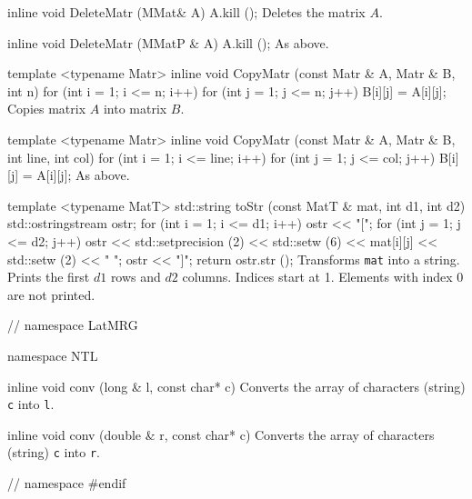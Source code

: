 {inline void DeleteMatr (MMat& A)\hide
{
    A.kill ();
}
\endhide
\endcode
\tab
Deletes the matrix $A$.
\endtab
\code


inline void DeleteMatr (MMatP & A)\hide
{
    A.kill ();
}
\endhide
\endcode
\tab
As above.
\endtab
\code


template <typename Matr>
inline void CopyMatr (const Matr & A, Matr & B, int n)\hide
{
    for (int i = 1; i <= n; i++)
        for (int j = 1; j <= n; j++)
            B[i][j] = A[i][j];
}
\endhide
\endcode
\tab
Copies matrix $A$ into matrix $B$.
\endtab
\code


template <typename Matr>
inline void CopyMatr (const Matr & A, Matr & B, int line, int col)\hide
{
    for (int i = 1; i <= line; i++)
        for (int j = 1; j <= col; j++)
            B[i][j] = A[i][j];
}
\endhide
\endcode
\tab
As above.
\endtab
\code


template <typename MatT>
std::string toStr (const MatT & mat, int d1, int d2) \hide
{
   std::ostringstream ostr;
   for (int i = 1; i <= d1; i++) {
      ostr << "[";
      for (int j = 1; j <= d2; j++) {
         ostr << std::setprecision (2) << std::setw (6) << mat[i][j] <<
            std::setw (2) << " ";
      }
      ostr << "]\n";
   }
   return ostr.str ();
}\endhide
\endcode
\tab
Transforms \texttt{mat} into a string. Prints the first $d1$ rows and
 $d2$ columns. Indices start at 1. Elements with index 0 are not printed.
\endtab
\code

}     // namespace LatMRG
\endcode


\code
namespace NTL {

inline void conv (long & l, const char* c) \endhide
\endcode
\tab
Converts the array of characters (string) \texttt{c} into \texttt{l}.
\endtab
\code


inline void conv (double & r, const char* c) \endhide
\endcode
\tab
Converts the array of characters (string) \texttt{c} into \texttt{r}.
\endtab
\code

}     // namespace
\hide
#endif
\endhide
\endcode
